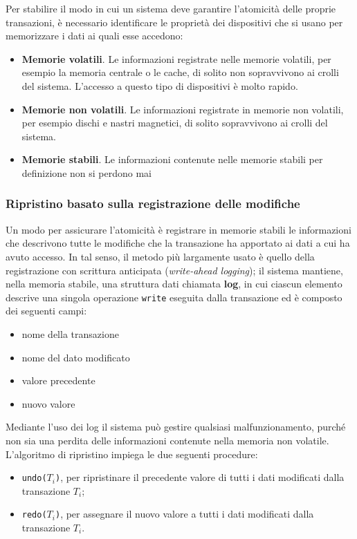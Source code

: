 \documentclass[11pt,a4paper]{article}
\begin{document}
Per stabilire il modo in cui un sistema deve garantire l'atomicità delle proprie transa­zioni, è necessario identificare le proprietà dei dispositivi che si usano per memorizzare i da­ti ai quali esse accedono:
\begin{itemize}
  \item \textbf{Memorie volatili}. Le informazioni registrate nelle memorie volatili, per esempio la memoria centrale o le cache, di solito non sopravvivono ai crolli del sistema. L'accesso a questo tipo di dispositivi è molto rapido.
  \item \textbf{Memorie non volatili}. Le informazioni registrate in memorie non volatili, per esem­pio dischi e nastri magnetici, di solito sopravvivono ai crolli del sistema.
  \item \textbf{Memorie stabili}. Le informazioni contenute nelle memorie stabili per definizione non si perdono mai
\end{itemize}

\subsubsection{Ripristino basato sulla registrazione delle modifiche}
Un modo per assicurare l'atomicità è registrare in memorie stabili le informazioni che de­scrivono tutte le modifiche che la transazione ha apportato ai dati a cui ha avuto accesso. In
tal senso, il metodo più largamente usato è quello della registrazione con scrittura anticipa­ta (\emph{write-ahead logging}); il sistema mantiene, nella memoria stabile, una struttura dati chia­mata \textbf{log}, in cui ciascun elemento descrive una singola operazione \texttt{write} eseguita dalla
transazione ed è composto dei seguenti campi:
\begin{itemize}
  \item nome della transazione
  \item nome del dato modificato
  \item valore precedente
  \item nuovo valore
\end{itemize}
%
Mediante l'uso dei log il sistema può gestire qualsiasi malfunzionamento, purché non
sia una perdita delle informazioni contenute nella memoria non volatile. L'algoritmo di ri­pristino impiega le due seguenti procedure:
\begin{itemize}
  \item \texttt{undo($T_i$)}, per ripristinare il precedente valore di tutti i dati modificati dalla transa­zione $T_i$;
  \item \texttt{redo($T_i$)}, per assegnare il nuovo valore a tutti i dati modificati dalla transazione $T_i$.
\end{itemize}
\end{document}
